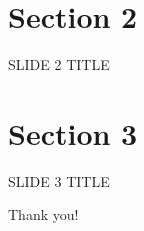 \documentclass[10pt,xcolor={dvipsnames},aspectratio=169]{beamer}
\begin{document}
\section{Section 2}

\begin{frame}{SLIDE 2 TITLE}
\end{frame}

\section{Section 3}

\begin{frame}{SLIDE 3 TITLE}
\end{frame}

\begin{frame}[standout]
Thank you!
\end{frame}



%  
\end{document}
